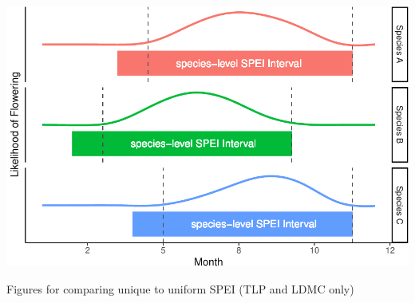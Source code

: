 \documentclass[
]{article}
\begin{document}
\includegraphics{figures/uniqueSPEIfig-1.pdf}

Figures for comparing unique to uniform SPEI (TLP and LDMC only)
\end{document}
